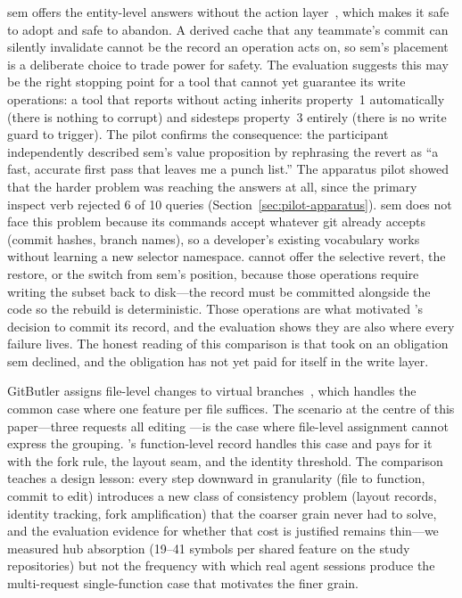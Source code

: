 sem offers the entity-level answers without the action layer~\cite{sem2026},
which makes it safe to adopt and safe to abandon. A derived cache that any
teammate's commit can silently invalidate cannot be the record an operation acts
on, so sem's placement is a deliberate choice to trade power for safety. The
evaluation suggests this may be the right stopping point for a tool that cannot
yet guarantee its write operations: a tool that reports without acting inherits
property~1 automatically (there is nothing to corrupt) and sidesteps property~3
entirely (there is no write guard to trigger). The pilot confirms the
consequence: the participant independently described sem's value proposition by
rephrasing the revert as ``a fast, accurate first pass that leaves me a punch
list.'' The apparatus pilot showed that the harder problem was reaching the
answers at all, since the primary inspect verb rejected 6 of 10 queries
(Section~\ref{sec:pilot-apparatus}). sem does not face this problem because its
commands accept whatever git already accepts (commit hashes, branch names), so a
developer's existing vocabulary works without learning a new selector namespace.
\sgt{} cannot offer the selective
revert, the restore, or the switch from sem's position, because those operations
require writing the subset back to disk---the record must be committed alongside
the code so the rebuild is deterministic. Those operations are what motivated
\sgt{}'s decision to commit its record, and the evaluation shows they are also
where every failure lives. The honest reading of this comparison is that \sgt{}
took on an obligation sem declined, and the obligation has not yet paid for
itself in the write layer.

GitButler assigns file-level changes to virtual branches~\cite{gitbutler2026},
which handles the common case where one feature per file suffices. The scenario at the centre of
this paper---three requests all editing ---is the case
where file-level assignment cannot express the grouping. \sgt{}'s function-level
record handles this case and pays for it with the fork rule, the layout seam,
and the identity threshold. The comparison teaches a design lesson: every step
downward in granularity (file to function, commit to edit) introduces a new
class of consistency problem (layout records, identity tracking, fork
amplification) that the coarser grain never had to solve, and the evaluation
evidence for whether that cost is justified remains thin---we measured hub
absorption (19--41 symbols per shared feature on the study repositories) but not
the frequency with which real agent sessions produce the multi-request
single-function case that motivates the finer grain.

